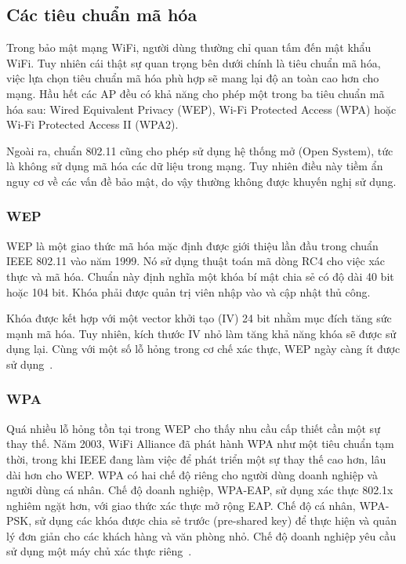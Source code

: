 \subsection{Các tiêu chuẩn mã hóa}
Trong bảo mật mạng WiFi, người dùng thường chỉ quan tấm đến mật khẩu WiFi. Tuy nhiên cái thật sự quan trọng bên dưới chính là tiêu chuẩn mã hóa, việc lựa chọn tiêu chuẩn mã hóa phù hợp sẽ mang lại độ an toàn cao hơn cho mạng. Hầu hết các AP đều có khả năng cho phép một trong ba tiêu chuẩn mã hóa sau: Wired Equivalent Privacy (WEP), Wi-Fi Protected Access (WPA) hoặc Wi-Fi Protected Access II (WPA2).

Ngoài ra, chuẩn 802.11 cũng cho phép sử dụng hệ thống mở (Open System), tức là không sử dụng mã hóa các dữ liệu trong mạng. Tuy nhiên điều này tiềm ẩn nguy cơ về các vấn đề bảo mật, do vậy thường không được khuyến nghị sử dụng.

\subsubsection{WEP}
WEP là một giao thức mã hóa mặc định được giới thiệu lần đầu trong chuẩn IEEE 802.11 vào năm 1999. Nó sử dụng thuật toán mã dòng RC4 cho việc xác thực và mã hóa. Chuẩn này định nghĩa một khóa bí mật chia sẻ có độ dài 40 bit hoặc 104 bit. Khóa phải được quản trị viên nhập vào và cập nhật thủ công.

Khóa được kết hợp với một vector khởi tạo (IV) 24 bit nhằm mục đích tăng sức mạnh mã hóa. Tuy nhiên, kích thước IV nhỏ làm tăng khả năng khóa sẽ được sử dụng lại. Cùng với một số lỗ hỏng trong cơ chế xác thực, WEP ngày càng ít được sử dụng~\cite{guillaume2005wifi}.

\subsubsection{WPA}
Quá nhiều lỗ hỏng tồn tại trong WEP cho thấy nhu cầu cấp thiết cần một sự thay thế. Năm 2003, WiFi Alliance đã phát hành WPA như một tiêu chuẩn tạm thời, trong khi IEEE đang làm việc để phát triển một sự thay thế cao hơn, lâu dài hơn cho WEP. WPA có hai chế độ riêng cho người dùng doanh nghiệp và người dùng cá nhân. Chế độ doanh nghiệp, WPA-EAP, sử dụng xác thực 802.1x nghiêm ngặt hơn, với giao thức xác thực mở rộng EAP. Chế độ cá nhân, WPA-PSK, sử dụng các khóa được chia sẻ trước (pre-shared key) để thực hiện và quản lý đơn giản cho các khách hàng và văn phòng nhỏ. Chế độ doanh nghiệp yêu cầu sử dụng một máy chủ xác thực riêng~\cite{guillaume2005wifi}.


